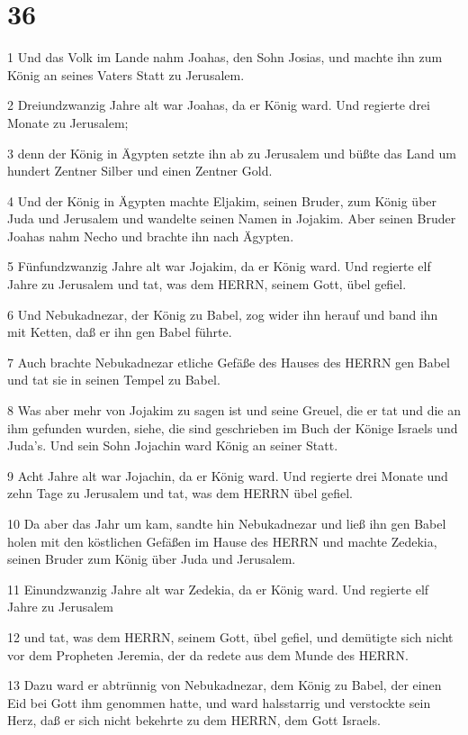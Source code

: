 \chapter{36}

\par 1 Und das Volk im Lande nahm Joahas, den Sohn Josias, und machte ihn zum König an seines Vaters Statt zu Jerusalem.
\par 2 Dreiundzwanzig Jahre alt war Joahas, da er König ward. Und regierte drei Monate zu Jerusalem;
\par 3 denn der König in Ägypten setzte ihn ab zu Jerusalem und büßte das Land um hundert Zentner Silber und einen Zentner Gold.
\par 4 Und der König in Ägypten machte Eljakim, seinen Bruder, zum König über Juda und Jerusalem und wandelte seinen Namen in Jojakim. Aber seinen Bruder Joahas nahm Necho und brachte ihn nach Ägypten.
\par 5 Fünfundzwanzig Jahre alt war Jojakim, da er König ward. Und regierte elf Jahre zu Jerusalem und tat, was dem HERRN, seinem Gott, übel gefiel.
\par 6 Und Nebukadnezar, der König zu Babel, zog wider ihn herauf und band ihn mit Ketten, daß er ihn gen Babel führte.
\par 7 Auch brachte Nebukadnezar etliche Gefäße des Hauses des HERRN gen Babel und tat sie in seinen Tempel zu Babel.
\par 8 Was aber mehr von Jojakim zu sagen ist und seine Greuel, die er tat und die an ihm gefunden wurden, siehe, die sind geschrieben im Buch der Könige Israels und Juda's. Und sein Sohn Jojachin ward König an seiner Statt.
\par 9 Acht Jahre alt war Jojachin, da er König ward. Und regierte drei Monate und zehn Tage zu Jerusalem und tat, was dem HERRN übel gefiel.
\par 10 Da aber das Jahr um kam, sandte hin Nebukadnezar und ließ ihn gen Babel holen mit den köstlichen Gefäßen im Hause des HERRN und machte Zedekia, seinen Bruder zum König über Juda und Jerusalem.
\par 11 Einundzwanzig Jahre alt war Zedekia, da er König ward. Und regierte elf Jahre zu Jerusalem
\par 12 und tat, was dem HERRN, seinem Gott, übel gefiel, und demütigte sich nicht vor dem Propheten Jeremia, der da redete aus dem Munde des HERRN.
\par 13 Dazu ward er abtrünnig von Nebukadnezar, dem König zu Babel, der einen Eid bei Gott ihm genommen hatte, und ward halsstarrig und verstockte sein Herz, daß er sich nicht bekehrte zu dem HERRN, dem Gott Israels.
